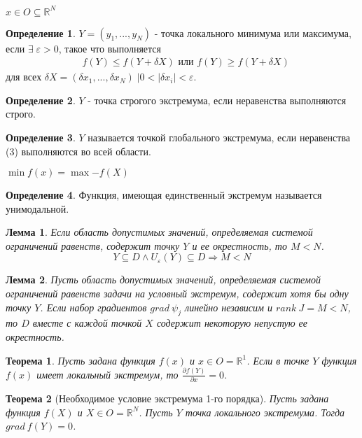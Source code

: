 \documentclass[12pt]{article}
\newtheorem{lemma}{Лемма}[subsection]
\newtheorem{theorem}{Теорема}[subsection]
\theoremstyle{definition}
\newtheorem{definition}{Определение}[section]
\theoremstyle{remark}
\begin{document}
$x\in O\subseteq \mathbb{R}^N$
\begin{definition}
  $Y=(y_1,...,y_N)$ - точка локального минимума или максимума, если $\exists \;\varepsilon >0$, такое что выполняется
   \begin{align}
     &f(Y) \leqslant f(Y+\delta X)\text{ или }f(Y) \geqslant f(Y+\delta X)
   \end{align}
   для всех $\delta X=(\delta x_1,...,\delta x_N)\;\big|0<|\delta x_i|<\varepsilon$.
\end{definition}
\begin{definition}
 $Y$ - точка строгого экстремума, если неравенства выполняются строго.
\end{definition}
\begin{definition}
 $Y$ называется точкой глобального экстремума, если неравенства (3) выполняются во всей области.
\end{definition}
$\min{f(x)}=\max{-f(X)}$
\begin{definition}
Функция, имеющая единственный экстремум называется унимодальной.
\end{definition}
\begin{lemma}
  Если область допустимых значений, определяемая системой ограничений равенств, содержит точку $Y$ и ее окрестность, то $M<N$.\\
  \begin{equation}
    Y\subseteq D\land U_{\varepsilon}(Y)\subseteq D\Rightarrow M<N
  \end{equation}
\end{lemma}
\begin{lemma}
  Пусть область допустимых значений, определяемая системой ограничений равенств задачи на условный экстремум, содержит хотя бы одну точку $Y$. Если набор градиентов $grad\: \psi_j$ линейно независим и $rank\: J=M<N$, то $D$ вместе с каждой точкой $X$ содержит некоторую непустую ее окрестность.
\end{lemma}
\begin{theorem}
Пусть задана функция $f(x)$ и $x\in O=\mathbb{R}^1$. Если в точке $Y$ функция $f(x)$ имеет локальный экстремум, то $\displaystyle \frac{\partial f(Y)}{\partial x}=0$.
\end{theorem}
\begin{theorem}[Необходимое условие экстремума 1-го порядка]
Пусть задана функция $f(X)$ и $X\in O=\mathbb{R}^N$. Пусть $Y$ точка локального экстремума. Тогда $grad\:f(Y)=0$.
\end{theorem}
\end{document}
